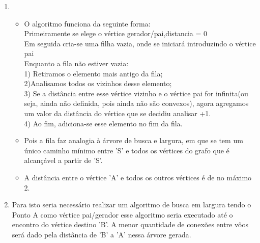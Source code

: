 \documentclass[11pt,reqno]{amsart}
\begin{document}
\begin{enumerate}
\item 
\begin{itemize}
	\item O algoritmo funciona da seguinte forma:\\Primeiramente se elege o vértice gerador/pai,distancia = 0\\Em seguida cria-se uma filha vazia, onde se iniciará introduzindo o vértice pai\\Enquanto a fila não estiver vazia:\\ 1) Retiramos o elemento mais antigo da fila;\\ 2)Analisamos todos os vizinhos desse elemento;\\ 3) Se a distância entre esse vértice vizinho e o vértice pai for infinita(ou seja, ainda não definida, pois ainda não são convexos), agora agregamos um valor da distância do vértice que se decidiu analisar +1.\\ 4) Ao fim, adiciona-se esse elemento no fim da fila.
	\item Pois a fila faz analogia à árvore de busca e largura, em que se tem um único caminho mínimo entre 'S' e todos os vértices do grafo que é alcançável a partir de 'S'.
	\item A distância entre o vértice 'A' e todos os outros vértices é de no máximo 2.
\end{itemize}
\vspace{0.3cm}{}
{}
\item Para isto seria necessário realizar um algoritmo de busca em largura tendo o Ponto A como vértice pai/gerador esse algoritmo seria executado até o encontro do vértice destino 'B'. A menor quantidade de conexões entre vôos será dado pela distância de 'B' a 'A' nessa árvore gerada.




\end{enumerate}
\end{document}
